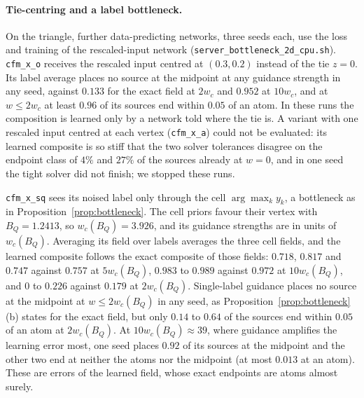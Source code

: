 \documentclass{article} %
\theoremstyle{plain}
\theoremstyle{definition}
\theoremstyle{remark}
\begin{document}
\paragraph{Tie-centring and a label bottleneck.}
\label{apx:bottleneck-runs}
On the triangle, further data-predicting networks, three seeds each, use the loss and training of
the rescaled-input network (\texttt{server\_bottleneck\_2d\_cpu.sh}). \texttt{cfm\_x\_o} receives the
rescaled input centred at $(0.3,0.2)$ instead of the tie $z=0$. Its label average places no source
at the midpoint at any guidance strength in any seed, against $0.133$ for the exact field at $2w_c$
and $0.952$ at $10w_c$, and at $w\le2w_c$ at least $0.96$ of its sources end within $0.05$ of an
atom. In these runs the composition is learned only by a network told where the tie is. A
variant with one rescaled input centred at each vertex (\texttt{cfm\_x\_a}) could not be
evaluated: its learned composite is so stiff that the two solver tolerances disagree on the
endpoint class of $4\%$ and $27\%$ of the sources already at $w=0$, and in one seed the tight solver
did not finish; we stopped these runs.

\texttt{cfm\_x\_sq} sees its noised label only through the cell $\arg\max_k y_k$, a bottleneck as in
Proposition~\ref{prop:bottleneck}. The cell priors favour their vertex with $B_Q=1.2413$, so
$w_c(B_Q)=3.926$, and its guidance strengths are in units of $w_c(B_Q)$. Averaging its field over
labels averages the three cell fields, and the learned composite follows the exact composite of
those fields: $0.718$, $0.817$ and $0.747$ against $0.757$ at $5w_c(B_Q)$, $0.983$ to $0.989$
against $0.972$ at $10w_c(B_Q)$, and $0$ to $0.226$ against $0.179$ at $2w_c(B_Q)$. Single-label
guidance places no source at the midpoint at $w\le2w_c(B_Q)$ in any seed, as
Proposition~\ref{prop:bottleneck}(b) states for the exact field, but only $0.14$ to $0.64$ of the
sources end within $0.05$ of an atom at $2w_c(B_Q)$. At $10w_c(B_Q)\approx39$, where guidance
amplifies the learning error most, one seed places $0.92$ of its sources at the midpoint and the
other two end at neither the atoms nor the midpoint (at most $0.013$ at an atom). These are errors
of the learned field, whose exact endpoints are atoms almost surely.
\end{document}

